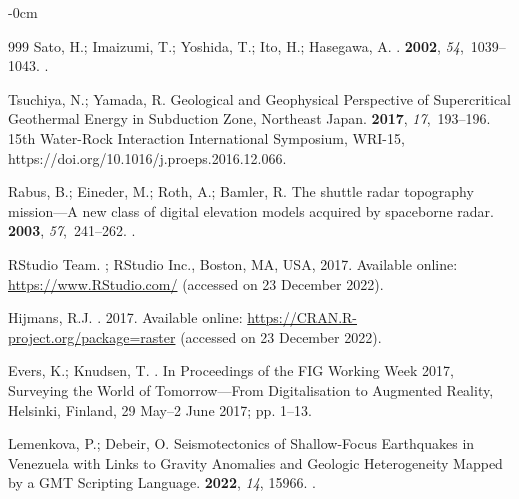 \documentclass[land,article,accept,pdftex,moreauthors]{Definitions/mdpi}
\begin{document}
\begin{adjustwidth}{-\extralength}{0cm}
\begin{thebibliography}{999}
Sato, H.; Imaizumi, T.; Yoshida, T.; Ito, H.; Hasegawa, A.
.
 {\bf 2002}, {\em 54},~1039--1043.
.

Tsuchiya, N.; Yamada, R.
\newblock Geological and Geophysical Perspective of Supercritical Geothermal
  Energy in Subduction Zone, Northeast Japan.
 {\bf 2017}, {\em
  17},~193--196.
\newblock 15th Water-Rock Interaction International Symposium, WRI-15,
  {{https://doi.org/10.1016/j.proeps.2016.12.066}}.

Rabus, B.; Eineder, M.; Roth, A.; Bamler, R.
\newblock The shuttle radar topography mission---A new class of digital
  elevation models acquired by spaceborne radar.
 {\bf 2003},
  {\em 57},~241--262.
.

RStudio Team.
;  
\newblock RStudio Inc., Boston, MA, USA, 2017.  Available online: \url{https://www.RStudio.com/}  (accessed on 23 December 2022).%

Hijmans, R.J.
.  2017.
\newblock Available online: \url{https://CRAN.R-project.org/package=raster}  (accessed on 23 December 2022).%

Evers, K.; Knudsen, T.
.
\newblock In Proceedings of the {FIG Working Week 2017, Surveying the World of
  Tomorrow---From Digitalisation to Augmented Reality}, Helsinki, Finland,  29 May--2 June 2017; pp. 1--13.

Lemenkova, P.; Debeir, O.
\newblock Seismotectonics of Shallow-Focus Earthquakes in Venezuela with Links
  to Gravity Anomalies and Geologic Heterogeneity Mapped by a GMT Scripting
  Language.
 {\bf 2022}, {\em 14}, 15966.
.


\end{thebibliography}
\end{adjustwidth}
\end{document}
